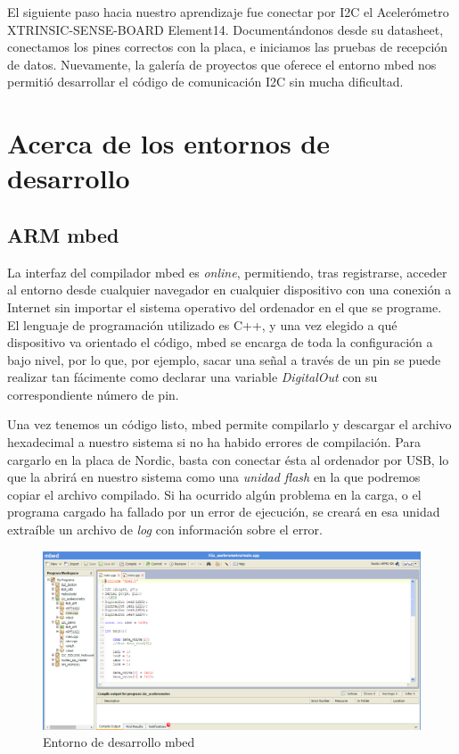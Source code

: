 El siguiente paso hacia nuestro aprendizaje fue conectar por I2C el Acelerómetro XTRINSIC-SENSE-BOARD Element14. Documentándonos desde su datasheet, conectamos los pines correctos con la placa, e iniciamos las pruebas de recepción de datos.
Nuevamente, la galería de proyectos que oferece el entorno mbed nos permitió desarrollar el código de comunicación I2C sin mucha dificultad.


\section{Acerca de los entornos de desarrollo}
\label{makereference4.2}

\subsection{ARM mbed}
\label{explicacionARMmbed}

La interfaz del compilador mbed es \textit{online}, permitiendo, tras registrarse, acceder al entorno desde cualquier navegador en cualquier dispositivo con una conexión a Internet sin importar el sistema operativo del ordenador en el que se programe. El lenguaje de programación utilizado es C++, y una vez elegido a qué dispositivo va orientado el código, mbed se encarga de toda la configuración a bajo nivel, por lo que, por ejemplo, sacar una señal a través de un pin se puede realizar tan fácimente como declarar una variable \textit{DigitalOut} con su correspondiente número de pin.

Una vez tenemos un código listo, mbed permite compilarlo y descargar el archivo hexadecimal a nuestro sistema si no ha habido errores de compilación. Para cargarlo en la placa de Nordic, basta con conectar ésta al ordenador por USB, lo que la abrirá en nuestro sistema como una \textit{unidad flash} en la que podremos copiar el archivo compilado. Si ha ocurrido algún problema en la carga, o el programa cargado ha fallado por un error de ejecución, se creará en esa unidad extraíble un archivo de \textit{log} con información sobre el error.

\begin{figure}[h]%
	\centering 	
    \includegraphics[width=\textwidth]{figures/mbed_compiler.PNG} %
   	\caption[Entorno de desarrollo mbed]{Entorno de desarrollo mbed}
   	\label{figuraMbedCompiler}

\end{figure}

